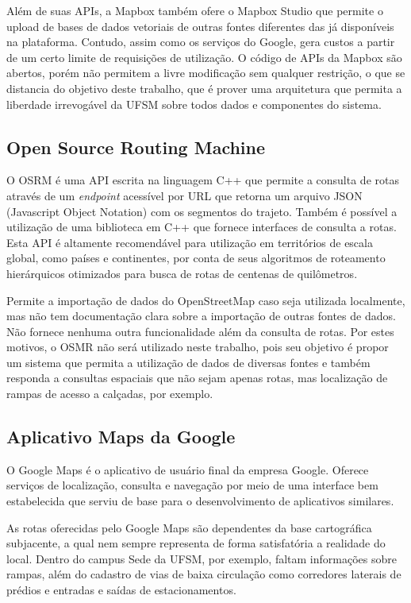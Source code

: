 \documentclass[oneside,openright,12pt]{ufsm_2015} %
\begin{document}
Além de suas APIs, a Mapbox também ofere o Mapbox Studio que permite o upload de bases de dados vetoriais de outras fontes diferentes das já disponíveis na plataforma. 
Contudo, assim como os serviços do Google, gera custos a partir de um certo limite de requisições de utilização. 
O código de APIs da Mapbox são abertos, porém não permitem a livre modificação sem qualquer restrição, o que se distancia do objetivo deste trabalho, que é prover uma arquitetura que permita a liberdade irrevogável da UFSM sobre todos dados e componentes do sistema. 

\subsection{Open Source Routing Machine}
O OSRM é uma API escrita na linguagem C++ que permite a consulta de rotas através de um \textit{endpoint} acessível por URL que retorna um arquivo JSON (Javascript Object Notation) com os segmentos do trajeto.
Também é possível a utilização de uma biblioteca em C++ que fornece interfaces de consulta a rotas. 
Esta API é altamente recomendável para utilização em territórios de escala global, como países e continentes, por conta de seus algoritmos de roteamento hierárquicos otimizados para busca de rotas de centenas de quilômetros.

Permite a importação de dados do OpenStreetMap caso seja utilizada localmente, mas não tem documentação clara sobre a importação de outras fontes de dados. 
Não fornece nenhuma outra funcionalidade além da consulta de rotas. 
Por estes motivos, o OSMR não será utilizado neste trabalho, pois seu objetivo é propor um sistema que permita a utilização de dados de diversas fontes e também responda a consultas espaciais que não sejam apenas rotas, mas localização de rampas de acesso a calçadas, por exemplo.

\subsection{Aplicativo Maps da Google}
O Google Maps é o aplicativo de usuário final da empresa Google. 
Oferece serviços de localização, consulta e navegação por meio de uma interface bem estabelecida que serviu de base para o desenvolvimento de aplicativos similares.

As rotas oferecidas pelo Google Maps são dependentes da base cartográfica subjacente, a qual nem sempre representa de forma satisfatória a realidade do local. 
Dentro do campus Sede da UFSM, por exemplo, faltam informações sobre rampas, além do cadastro de vias de baixa circulação como corredores laterais de prédios e entradas e saídas de estacionamentos.
\end{document}

